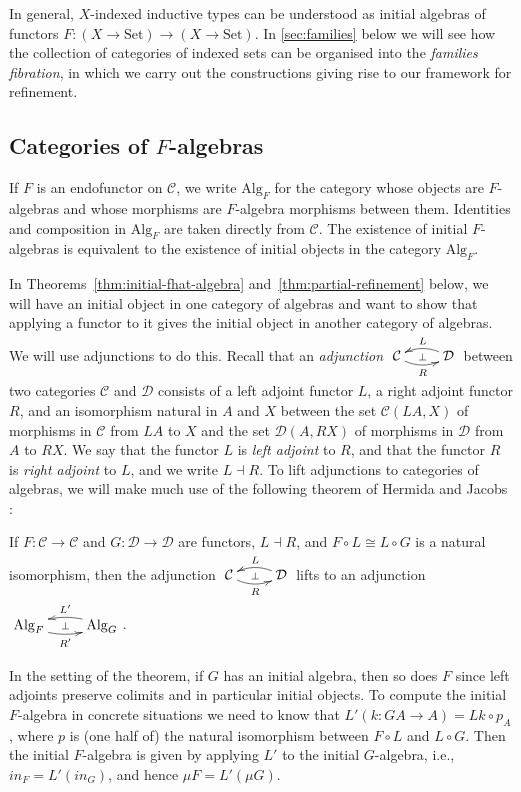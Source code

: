 \documentclass{LMCS}
\makeatletter
\newcommand{\cat}[1]{\mathcal{#1}}
\newcommand{\Set}{\mathrm{Set}}
\newcommand{\Alg}{\mathrm{Alg}}
\newcommand{\adjunction}[4]{\xymatrix{ {#1} \ar@/_/[r]_{#4}
    \ar@{}[r]|{\perp}& \ar@/_/[l]_{#3} {#2} }}
\makeatother
\begin{document}
In general, $X$-indexed inductive types can be understood as initial
algebras of functors $F : (X \to \Set) \to (X \to \Set)$. In
\autoref{sec:families} below we will see how the collection of
categories of indexed sets can be organised into the \emph{families
  fibration}, in which we carry out the constructions giving rise to
our framework for refinement.

\subsection{Categories of $F$-algebras}

If $F$ is an endofunctor on $\cat{C}$, we write $\Alg_F$ for the
category whose objects are $F$-algebras and whose morphisms are
$F$-algebra morphisms between them. Identities and composition in
$\Alg_F$ are taken directly from $\cat{C}$. The existence of initial
$F$-algebras is equivalent to the existence of initial objects in the
category $\Alg_F$.

In Theorems~\ref{thm:initial-fhat-algebra}
and~\ref{thm:partial-refinement} below, we will have an initial object
in one category of algebras and want to show that applying a functor
to it gives the initial object in another category of algebras. We
will use adjunctions to do this. Recall that an {\em adjunction}
$\adjunction{\cat{C}}{\cat{D}}{L}{R}$ between two categories $\cat{C}$
and $\cat{D}$ consists of a left adjoint functor $L$, a right adjoint
functor $R$, and an isomorphism natural in $A$ and $X$ between the set
$\cat{C}(LA,X)$ of morphisms in $\cat{C}$ from $LA$ to $X$ and the set
$\cat{D}(A,RX)$ of morphisms in $\cat{D}$ from $A$ to $RX$. We say
that the functor $L$ is {\em left adjoint} to $R$, and that the
functor $R$ is {\em right adjoint} to $L$, and we write $L \dashv
R$. To lift adjunctions to categories of algebras, we will make much
use of the following theorem of Hermida and Jacobs
\cite{hermida98structural}:
\begin{thm}\label{thm:alg-adjunctions}
  If $F : \cat{C} \to \cat{C}$ and $G : \cat{D} \to \cat{D}$ are
  functors, $L \dashv R$, and $F \circ L \cong L \circ G$ is a natural
  isomorphism, then the adjunction
  $\adjunction{\cat{C}}{\cat{D}}{L}{R}$ lifts to an adjunction
  $\adjunction{\Alg_F}{\Alg_G}{L'}{R'}$.
\end{thm}

\noindent
In the setting of the theorem, if $G$ has an initial algebra, then so
does $F$ since left adjoints preserve colimits and in particular
initial objects. To compute the initial $F$-algebra in concrete
situations we need to know that $L' (k : GA \to A) = L k \circ p_A$,
where $p$ is (one half of) the natural isomorphism between $F \circ L$
and $L \circ G$. Then the initial $F$-algebra is given by applying
$L'$ to the initial $G$-algebra, i.e., $\mathit{in}_F =
L'(\mathit{in}_G)$, and hence $\mu F = L' (\mu G)$.
\end{document}
